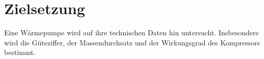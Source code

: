 
\section{Zielsetzung}
\label{sec:Zielsetzung}
Eine Wärmepumpe wird auf ihre technischen Daten hin untersucht. Insbesondere wird die Güteziffer, der Massendurchsatz und der Wirkungsgrad des Kompressors bestimmt.
